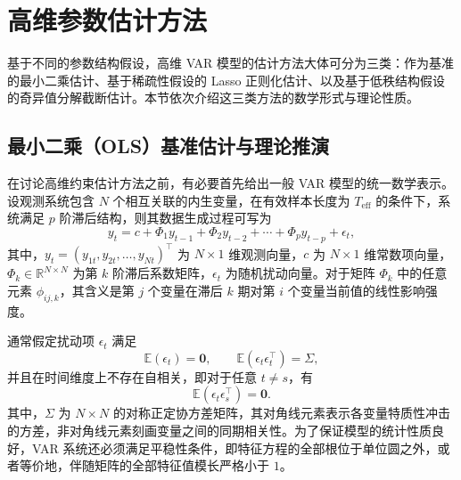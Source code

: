 
\section{高维参数估计方法}

基于不同的参数结构假设，高维 VAR 模型的估计方法大体可分为三类：作为基准的最小二乘估计、基于稀疏性假设的 Lasso 正则化估计、以及基于低秩结构假设的奇异值分解截断估计。本节依次介绍这三类方法的数学形式与理论性质。

\subsection{最小二乘（OLS）基准估计与理论推演}

在讨论高维约束估计方法之前，有必要首先给出一般 VAR 模型的统一数学表示。设观测系统包含 $N$ 个相互关联的内生变量，在有效样本长度为 $T_{\mathrm{eff}}$ 的条件下，系统满足 $p$ 阶滞后结构，则其数据生成过程可写为
\begin{equation}
 y_t = c + \Phi_1 y_{t-1} + \Phi_2 y_{t-2} + \cdots + \Phi_p y_{t-p} + \epsilon_t,
\end{equation}
其中，$y_t=(y_{1t},y_{2t},\dots,y_{Nt})^{\top}$ 为 $N\times 1$ 维观测向量，$c$ 为 $N\times 1$ 维常数项向量，$\Phi_k\in\mathbb{R}^{N\times N}$ 为第 $k$ 阶滞后系数矩阵，$\epsilon_t$ 为随机扰动向量。对于矩阵 $\Phi_k$ 中的任意元素 $\phi_{ij,k}$，其含义是第 $j$ 个变量在滞后 $k$ 期对第 $i$ 个变量当前值的线性影响强度。

通常假定扰动项 $\epsilon_t$ 满足
\begin{equation}
 \mathbb{E}(\epsilon_t)=\bm{0}, \qquad \mathbb{E}(\epsilon_t\epsilon_t^{\top})=\Sigma,
\end{equation}
并且在时间维度上不存在自相关，即对于任意 $t\neq s$，有
\begin{equation}
 \mathbb{E}(\epsilon_t\epsilon_s^{\top})=\bm{0}.
\end{equation}
其中，$\Sigma$ 为 $N\times N$ 的对称正定协方差矩阵，其对角线元素表示各变量特质性冲击的方差，非对角线元素刻画变量之间的同期相关性。为了保证模型的统计性质良好，VAR 系统还必须满足平稳性条件，即特征方程的全部根位于单位圆之外，或者等价地，伴随矩阵的全部特征值模长严格小于 $1$。

